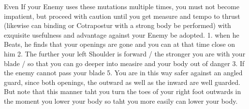 
Even If your Enemy uses these mutations multiple times, you must not
become impatient, but proceed with caution until you get measure and
tempo to thrust (likewise can binding or Cotrapostur with a strong
body be performed) with exquisite usefulness and advantage against
your Enemy be adopted. 1. when he Beats, he finds that your openings
are gone and you can at that time close on him 2. The further your
left Shoulder is forward / the stronger you are with your blade / so
that you can go deeper into measire and your body out of danger 3. If
the enemy cannot pass your blade 5. You are in this way safer against
an angled guard, since both openings, the outward as well as the
inward are well guarded. But note that this manner taht you turn the
toes of your right foot outwards in the moment you lower your body so
taht you more easily can lower your body.


